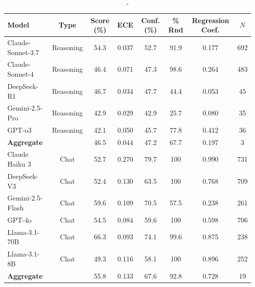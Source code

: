\begin{table}[h]
    \centering
    \small
    \begin{tabular}{lccccccc}
    \toprule
    \textbf{Model} & \textbf{Type} & \textbf{Score (\%)} & \textbf{ECE} & \textbf{Conf. (\%)} & \textbf{\% Rnd} & \textbf{Regression Coef.} & \textbf{$N$} \\
    \midrule
    Claude-Sonnet-3.7    & Reasoning & 54.3 & 0.037 & 52.7 & 91.9  & 0.177 & 692 \\
    Claude-Sonnet-4      & Reasoning & 46.4 & 0.071 & 47.3 & 98.6  & 0.264 & 483 \\
    DeepSeek-R1          & Reasoning & 46.7 & 0.034 & 47.7 & 44.4  & 0.053 & 45 \\
    Gemini-2.5-Pro       & Reasoning & 42.9 & 0.029 & 42.9 & 25.7  & 0.080 & 35 \\
    GPT-o3               & Reasoning & 42.1 & 0.050 & 45.7 & 77.8  & 0.412 & 36 \\
    \midrule
    {\textbf{Aggregate}}  &           & 46.5 & 0.044 & 47.2 & 67.7  & 0.197 & 3 \\
    \midrule
    Claude Haiku 3       & Chat & 52.7 & 0.270 & 79.7 & 100  & 0.990 & 731 \\
    DeepSeek-V3          & Chat & 52.4 & 0.130 & 63.5 & 100  & 0.768 & 709 \\
    Gemini-2.5-Flash     & Chat & 59.6 & 0.109 & 70.5 & 57.5  & 0.238 & 261 \\
    GPT-4o               & Chat & 54.5 & 0.084 & 59.6 & 100  & 0.598 & 706 \\
    Llama-3.1-70B        & Chat & 66.3 & 0.093 & 74.1 & 99.6  & 0.875 & 238 \\
    Llama-3.1-8B         & Chat & 49.3 & 0.116 & 58.1 & 100  & 0.896 & 252 \\
    \midrule
    {\textbf{Aggregate}}  &           & 55.8 & 0.133 & 67.6 & 92.8  & 0.728 & 19 \\
    \bottomrule
    \end{tabular}
    \caption{-}
    \label{-}
\end{table}